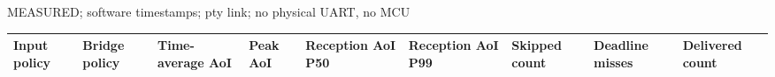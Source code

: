 \par\noindent MEASURED; software timestamps; pty link; no physical UART, no MCU\par
\begin{tabular}{lllllllll}
\toprule
Input policy & Bridge policy & Time-average AoI & Peak AoI & Reception AoI P50 & Reception AoI P99 & Skipped count & Deadline misses & Delivered count \\
\midrule
\bottomrule
\end{tabular}
